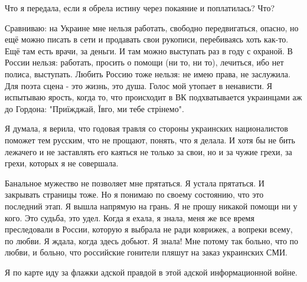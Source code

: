 Что я передала, если я обрела истину через покаяние и поплатилась? Что?

Сравниваю: на Украине мне нельзя работать, свободно передвигаться, опасно, но
ещё можно писать в сети и продавать свои рукописи, перебиваясь хоть как-то. Ещё
там есть врачи, за деньги. И там можно выступать раз в году с охраной. В России
нельзя: работать, просить о помощи (ни то, ни то), лечиться, ибо нет полиса,
выступать. Любить Россию тоже нельзя: не имею права, не заслужила. Для поэта
сцена - это жизнь, это душа. Голос мой утопает в ненависти. Я испытываю ярость,
когда то, что происходит в ВК подхватывается украинцами аж до Гордона:
"Приїжджай, Ївго, ми тебе стрінемо".

Я думала, я верила, что годовая травля со стороны украинских националистов
поможет тем русским, что не прощают, понять, что я делала. И хотя бы не бить
лежачего и не заставлять его каяться не только за свои, но и за чужие грехи, за
грехи, которых я не совершала.

Банальное мужество не позволяет мне прятаться. Я устала прятаться. И закрывать
страницы тоже. Но я понимаю по своему состоянию, что это последний этап. Я
вышла напрямую на грань. Я не прошу никакой помощи ни у кого. Это судьба, это
удел. Когда я ехала, я знала, меня же все время преследовали в России, которую
я выбрала не ради коврижек, а вопреки всему, по любви. Я ждала, когда здесь
добьют. Я знала! Мне потому так больно, что по любви, и больно, что российские
гонители пляшут на заказ украинских СМИ.

Я по карте иду за флажки адской правдой в этой адской информационной войне.

